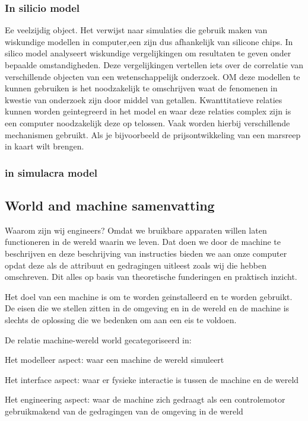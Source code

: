 \subsubsection{In silicio model}
Ee veelzijdig object. Het verwijst naar simulaties die gebruik maken van wiskundige modellen in computer,een zijn dus afhankelijk van silicone chips. In silico model analyseert  wiskundige vergelijkingen om resultaten te geven onder bepaalde omstandigheden. Deze vergelijkingen vertellen iets over de correlatie van verschillende objecten van een wetenschappelijk onderzoek. OM deze modellen te kunnen gebruiken is het noodzakelijk te omschrijven waat de fenomenen in kwestie van onderzoek zijn door middel van getallen. Kwanttitatieve relaties kunnen worden geintegreerd in het model en waar deze relaties complex zijn is een computer noodzakelijk deze op telossen. Vaak worden hierbij verschillende mechanismen gebruikt. Als je bijvoorbeeld de prijsontwikkeling van een marsreep in kaart wilt brengen.
\subsubsection{in simulacra model}

\subsection{World and machine samenvatting}
Waarom zijn wij engineers? Omdat we bruikbare apparaten willen laten functioneren in de wereld waarin we leven. Dat doen we door de machine te beschrijven en deze beschrijving van instructies bieden we aan onze computer opdat deze als de attribuut en gedragingen uitleest zoals wij die hebben omschreven. Dit alles op basis van theoretische funderingen en praktisch inzicht. 

Het doel van een machine is om te worden geinstalleerd en te worden gebruikt. De eisen die we stellen zitten in de omgeving en in de wereld en de machine is slechts de oplossing die we bedenken om aan een eis te voldoen. 

De relatie machine-wereld world gecategoriseerd in: 

Het modelleer aspect: waar een machine de wereld simuleert 

Het interface aspect: waar er fysieke interactie is tussen de machine en de wereld 

Het engineering aspect: waar de machine zich gedraagt als een controlemotor gebruikmakend van de gedragingen van de omgeving in de wereld 

